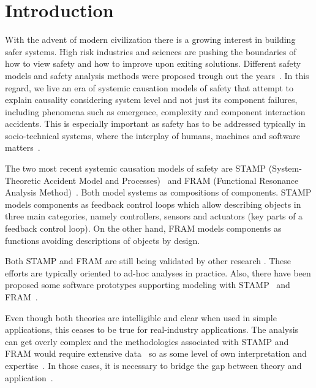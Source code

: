 \documentclass[sw]{iosart2x}
\newcommand{\TODO}[1]{{\color{red}{\textbf{TODO: {#1}}\xspace}}}
\begin{document}
\section{Introduction}
\label{sec:intro}
With the advent of modern civilization there is a growing interest in building safer systems. High risk industries and sciences are pushing the boundaries of how to view safety and how to improve upon exiting solutions. Different safety models and safety analysis methods were proposed trough out the years~\cite{ECTL2009}. In this regard, we live an era of systemic causation models of safety that attempt to explain causality considering system level and not just its component failures, including phenomena such as emergence, complexity and component interaction accidents. This is especially important as safety has to be addressed typically in socio-technical systems, where the interplay of humans, machines and software matters~\cite{dekker2017}.

The two most recent systemic causation models of safety are STAMP (System-Theoretic Accident Model and Processes)~\cite{leveson2012engineering} and FRAM (Functional Resonance Analysis Method)~\cite{hollnagel2012fram}. Both model systems as compositions of components. STAMP models components as feedback control loops which allow describing objects in three main categories, namely controllers, sensors and actuators (key parts of a feedback control loop). On the other hand, FRAM models components as functions avoiding descriptions of objects by design. 

Both STAMP and FRAM are still being validated by other research \cite{yaosong2012, Pereira2015, Underwood2016, Allison2017, Zhou2018, Patriarca2017add, FUKUDA2016,Patriarca2018}.
These efforts are typically oriented to ad-hoc analyses in practice. Also, there have been proposed some software prototypes supporting modeling with STAMP~\cite{Abdulkhaleq2014a, Abdulkhaleq2015, Abdulkhaleq2016} and FRAM~\cite{Rees2016}. 

Even though both theories are intelligible and clear when used in simple applications, this ceases to be true for real-industry applications. The analysis can get overly complex and the methodologies associated with STAMP and FRAM would require extensive data~\cite{Kim2016} so as some level of own interpretation and expertise~\cite{Hollnagel2008}. In those cases, it is necessary to bridge the gap between theory and application~\cite{Underwood2016}. 
\end{document}
